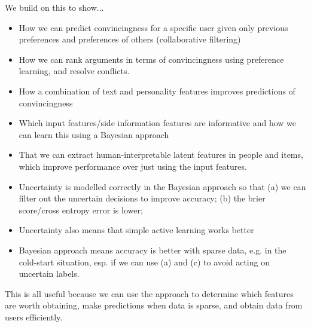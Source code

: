 We build on this to show...
\begin{itemize}
 \item How we can predict convincingness for a specific user given only previous preferences and 
 preferences of others (collaborative filtering)
 \item How we can rank arguments in terms of convincingness using preference learning, and resolve
 conflicts.
 \item How a combination of text and personality features improves predictions of convincingness
 \item Which input features/side information features are informative and how we can learn this using a Bayesian approach
 \item That we can extract human-interpretable latent features in people and items,
 which improve performance over just using the input features.
 \item Uncertainty is modelled correctly in the Bayesian approach so that (a) we can filter
 out the uncertain decisions to improve accuracy; (b) the brier score/cross entropy error is lower;
 \item Uncertainty also means that simple active learning works better
 \item Bayesian approach means accuracy is better with sparse data, e.g. in the cold-start situation,
  esp. if we can use (a) and (c) to avoid acting on uncertain labels.
\end{itemize}
This is all useful because we can use the approach to determine which features are worth 
obtaining, make predictions when data is sparse, and obtain data from users efficiently.

